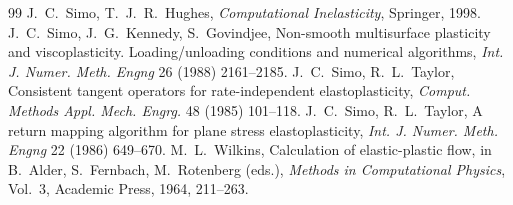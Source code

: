 \begin{chapterbib}{99}
 J.~C.~Simo, T.~J.~R.~Hughes, \emph{Computational Inelasticity}, Springer, 1998.
 J.~C.~Simo, J.~G.~Kennedy, S.~Govindjee, Non-smooth multisurface plasticity and viscoplasticity. Loading/unloading conditions and numerical algorithms, \emph{Int. J. Numer. Meth. Engng} 26 (1988) 2161--2185.
 J.~C.~Simo, R.~L.~Taylor, Consistent tangent operators for rate-independent elastoplasticity, \emph{Comput. Methods Appl. Mech. Engrg.} 48 (1985) 101--118.
 J.~C.~Simo, R.~L.~Taylor, A return mapping algorithm for plane stress elastoplasticity, \emph{Int. J. Numer. Meth. Engng} 22 (1986) 649--670.
 M.~L.~Wilkins, Calculation of elastic-plastic flow, in B.~Alder, S.~Fernbach, M.~Rotenberg (eds.), \emph{Methods in Computational Physics}, Vol.~3, Academic Press, 1964, 211--263.
\end{chapterbib}
